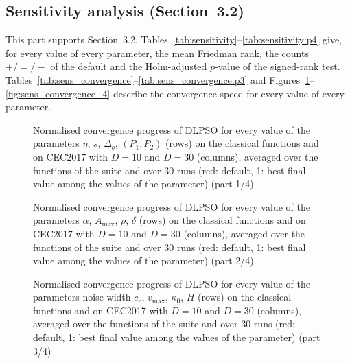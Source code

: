 


\FloatBarrier
\subsection{Sensitivity analysis (Section~3.2)}\label{app:sens}
This part supports Section~3.2. Tables~\ref{tab:sensitivity}--\ref{tab:sensitivity:p4} give, for every value of every parameter, the mean Friedman rank, the counts $+/=/-$ of the default and the Holm-adjusted $p$-value of the signed-rank test. Tables~\ref{tab:sens_convergence}--\ref{tab:sens_convergence:p3} and Figures~\ref{fig:sens_convergence}--\ref{fig:sens_convergence_4} describe the convergence speed for every value of every parameter.




\begin{figure}[!htbp]
    \centering
    \caption{Normalised convergence progress of DLPSO for every value of the parameters $\eta$, $s$, $\Delta_b$, $(P_1,P_2)$ (rows) on the classical functions and on CEC2017 with $D=10$ and $D=30$ (columns), averaged over the functions of the suite and over 30 runs (red: default, 1: best final value among the values of the parameter) (part 1/4)}
    \label{fig:sens_convergence}
\end{figure}

\begin{figure}[!htbp]
    \centering
    \caption{Normalised convergence progress of DLPSO for every value of the parameters $\alpha$, $A_{\max}$, $\rho$, $\delta$ (rows) on the classical functions and on CEC2017 with $D=10$ and $D=30$ (columns), averaged over the functions of the suite and over 30 runs (red: default, 1: best final value among the values of the parameter) (part 2/4)}
    \label{fig:sens_convergence_2}
\end{figure}

\begin{figure}[!htbp]
    \centering
    \caption{Normalised convergence progress of DLPSO for every value of the parameters noise width $c_r$, $v_{\max}$, $\kappa_0$, $H$ (rows) on the classical functions and on CEC2017 with $D=10$ and $D=30$ (columns), averaged over the functions of the suite and over 30 runs (red: default, 1: best final value among the values of the parameter) (part 3/4)}
    \label{fig:sens_convergence_3}
\end{figure}


